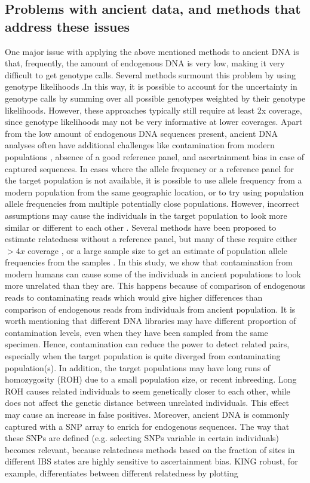 \documentclass[12pt, letterpaper]{article}
\begin{document}
\subsection{Problems with ancient data, and methods that address these issues}
One major issue with applying the above mentioned methods to ancient DNA is that, frequently, the amount of endogenous DNA is very low, making it very difficult to get genotype calls.
Several methods surmount this problem by using genotype likelihoods \cite{lipatov_maximum_2015,korneliussen_ngsrelate_2015}.In this way, it is possible to account for the uncertainty in genotype calls by summing over all possible genotypes weighted by their genotype likelihoods. However, these approaches typically still require at least 2x coverage, since genotype likelihoods may not be very informative at lower coverages. Apart from the low amount of endogenous DNA sequences present, ancient DNA analyses often have additional challenges like contamination from modern populations \cite{peyregne_authentict_2020}, absence of a good reference panel, and ascertainment bias in case of captured sequences. In cases where the allele frequency or a reference panel for the target population is not available, it is possible to use allele frequency from a modern population from the same geographic location, or to try using population allele frequencies from multiple potentially close populations. However, incorrect assumptions may cause the individuals in the target population to look more similar or different to each other \cite{amorim_understanding_2018}. Several methods have been proposed to estimate relatedness without a reference panel, but many of these require either $>4x$ coverage \cite{waples_allele_2019}, or a large sample size to get an estimate of population allele frequencies from the samples \cite{theunert_joint_2017}. In this study, we show that contamination from modern humans can cause some of the individuals in ancient populations to look more unrelated than they are. This happens because of comparison of endogenous reads to contaminating reads which would give higher differences than comparison of endogenous reads from individuals from ancient population. It is worth mentioning that different DNA libraries may have different proportion of contamination levels, even when they have been sampled from the same specimen. Hence, contamination can reduce the power to detect related pairs, especially when the target population is quite diverged from contaminating population(s). In addition, the target populations may have long runs of homozygosity (ROH) due to a small population size, or recent inbreeding. Long ROH causes related individuals to seem genetically closer to each other, while does not affect the genetic distance between unrelated individuals. This effect may cause an increase in false positives. Moreover, ancient DNA is commonly captured with a SNP array to enrich for endogenous sequences. The way that these SNPs are defined (e.g. selecting SNPs variable in certain individuals) becomes relevant, because relatedness methods based on the fraction of sites in different IBS states are highly sensitive to ascertainment bias. KING robust, for example, differentiates between different relatedness by plotting 
\end{document}
